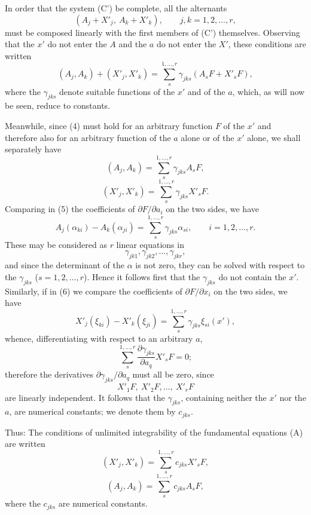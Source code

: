 \documentclass[11pt]{book}
\begin{document}
In order that the system (C') be complete, all the alternants
\[
 (A_j+X'_j,\ A_k+X'_k),\qquad j,k=1,2,\ldots,r,
\]
must be composed linearly with the first members of (C') themselves. Observing that the $x'$ do not enter the $A$ and the $a$ do not enter the $X'$, these conditions are written
\begin{equation*}\tag{4}
 (A_j,A_k)+(X'_j,X'_k)=\sum\limits_s^{1,\ldots,r} \gamma_{jks}(A_sF+X'_sF),
\end{equation*}
where the $\gamma_{jks}$ denote suitable functions of the $x'$ and of the $a$, which, as will now be seen, reduce to constants.

Meanwhile, since (4) must hold for an arbitrary function $F$ of the $x'$ and therefore also for an arbitrary function of the $a$ alone or of the $x'$ alone, we shall separately have
\begin{equation*}\tag{5}
 (A_j,A_k)=\sum\limits_s^{1,\ldots,r} \gamma_{jks} A_sF,
\end{equation*}
\begin{equation*}\tag{6}
 (X'_j,X'_k)=\sum\limits_s^{1,\ldots,r} \gamma_{jks} X'_sF.
\end{equation*}
Comparing in (5) the coefficients of $\partial F/\partial a_i$ on the two sides, we have
\[
 A_j(\alpha_{ki})-A_k(\alpha_{ji})=\sum\limits_s^{1,\ldots,r} \gamma_{jks}\alpha_{si},\qquad i=1,2,\ldots,r.
\]
These may be considered as $r$ linear equations in
\[
 \gamma_{jk1},\gamma_{jk2},\ldots,\gamma_{jkr},
\]
and since the determinant of the $\alpha$ is not zero, they can be solved with respect to the $\gamma_{jks}$ ($s=1,2,\ldots,r$). Hence it follows first that the $\gamma_{jks}$ do not contain the $x'$. Similarly, if in (6) we compare the coefficients of $\partial F/\partial x_i$ on the two sides, we have
\[
 X'_j(\xi_{ki})-X'_k(\xi_{ji})=\sum\limits_s^{1,\ldots,r}\gamma_{jks}\xi_{si}(x'),
\]
whence, differentiating with respect to an arbitrary $a$,
\[
 \sum\limits_s^{1,\ldots,r}\frac{\partial\gamma_{jks}}{\partial a_q}X'_sF=0;
\]
therefore the derivatives $\partial\gamma_{jks}/\partial a_q$ must all be zero, since
\[
 X'_1F,\ X'_2F,\ldots,\ X'_rF
\]
are linearly independent. It follows that the $\gamma_{jks}$, containing neither the $x'$ nor the $a$, are numerical constants; we denote them by $c_{jks}$.

Thus: The conditions of unlimited integrability of the fundamental equations (A) are written
\begin{equation*}\tag{$\alpha$}
 (X'_j,X'_k)=\sum\limits_s^{1,\ldots,r} c_{jks}X'_sF,
\end{equation*}
\begin{equation*}\tag{$\beta$}
 (A_j,A_k)=\sum\limits_s^{1,\ldots,r} c_{jks}A_sF,
\end{equation*}
where the $c_{jks}$ are numerical constants.
\end{document}
